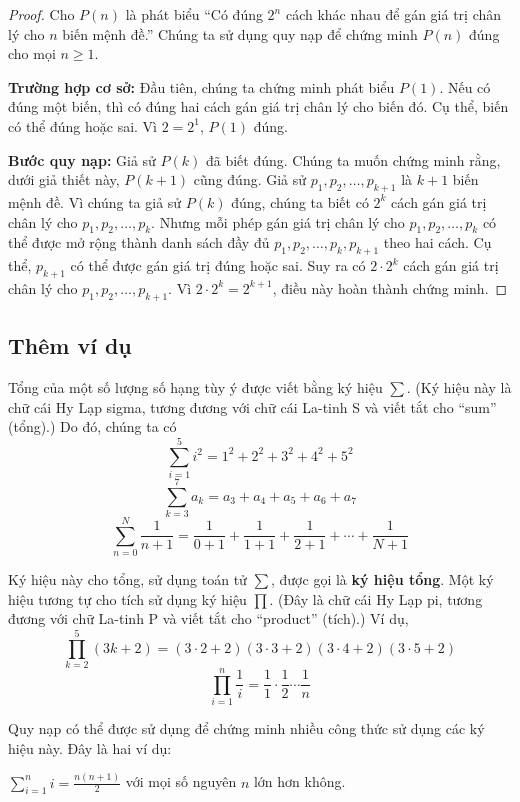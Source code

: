 \begin{proof}
Cho $P(n)$ là phát biểu ``Có đúng $2^n$ cách khác nhau để gán giá trị chân lý cho $n$ biến mệnh đề.'' Chúng ta sử dụng quy nạp để chứng minh $P(n)$ đúng cho mọi $n \geq 1$.

\textbf{Trường hợp cơ sở:} Đầu tiên, chúng ta chứng minh phát biểu $P(1)$. Nếu có đúng một biến, thì có đúng hai cách gán giá trị chân lý cho biến đó. Cụ thể, biến có thể đúng hoặc sai. Vì $2 = 2^1$, $P(1)$ đúng.

\textbf{Bước quy nạp:} Giả sử $P(k)$ đã biết đúng. Chúng ta muốn chứng minh rằng, dưới giả thiết này, $P(k+1)$ cũng đúng. Giả sử $p_1, p_2, \ldots, p_{k+1}$ là $k + 1$ biến mệnh đề. Vì chúng ta giả sử $P(k)$ đúng, chúng ta biết có $2^k$ cách gán giá trị chân lý cho $p_1, p_2, \ldots, p_k$. Nhưng mỗi phép gán giá trị chân lý cho $p_1, p_2, \ldots, p_k$ có thể được mở rộng thành danh sách đầy đủ $p_1, p_2, \ldots, p_k, p_{k+1}$ theo hai cách. Cụ thể, $p_{k+1}$ có thể được gán giá trị đúng hoặc sai. Suy ra có $2 \cdot 2^k$ cách gán giá trị chân lý cho $p_1, p_2, \ldots, p_{k+1}$. Vì $2 \cdot 2^k = 2^{k+1}$, điều này hoàn thành chứng minh.
\end{proof}

\subsection{Thêm ví dụ}

Tổng của một số lượng số hạng tùy ý được viết bằng ký hiệu $\sum$. (Ký hiệu này là chữ cái Hy Lạp sigma, tương đương với chữ cái La-tinh S và viết tắt cho ``sum'' (tổng).) Do đó, chúng ta có
\[\sum_{i=1}^{5} i^2 = 1^2 + 2^2 + 3^2 + 4^2 + 5^2\]
\[\sum_{k=3}^{7} a_k = a_3 + a_4 + a_5 + a_6 + a_7\]
\[\sum_{n=0}^{N} \frac{1}{n+1} = \frac{1}{0+1} + \frac{1}{1+1} + \frac{1}{2+1} + \cdots + \frac{1}{N+1}\]

Ký hiệu này cho tổng, sử dụng toán tử $\sum$, được gọi là \textbf{ký hiệu tổng}. Một ký hiệu tương tự cho tích sử dụng ký hiệu $\prod$. (Đây là chữ cái Hy Lạp pi, tương đương với chữ La-tinh P và viết tắt cho ``product'' (tích).) Ví dụ,
\[\prod_{k=2}^{5} (3k + 2) = (3 \cdot 2 + 2)(3 \cdot 3 + 2)(3 \cdot 4 + 2)(3 \cdot 5 + 2)\]
\[\prod_{i=1}^{n} \frac{1}{i} = \frac{1}{1} \cdot \frac{1}{2} \cdots \frac{1}{n}\]

Quy nạp có thể được sử dụng để chứng minh nhiều công thức sử dụng các ký hiệu này. Đây là hai ví dụ:

\begin{theorem}
$\displaystyle\sum_{i=1}^{n} i = \frac{n(n+1)}{2}$ với mọi số nguyên $n$ lớn hơn không.
\end{theorem}

